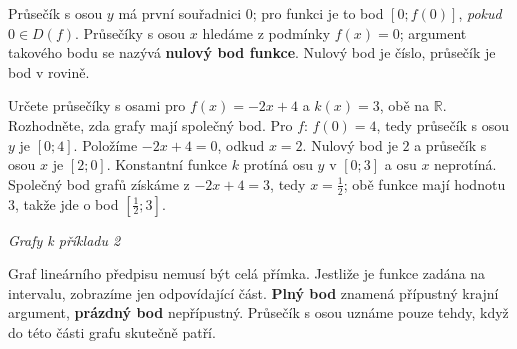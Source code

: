 \documentclass[11pt,a4paper]{article}
\begin{document}
Průsečík s osou $y$ má první souřadnici $0$; pro funkci je to bod $[0;f(0)]$,
\emph{pokud} $0\in D(f)$. Průsečíky s osou $x$ hledáme z podmínky $f(x)=0$;
argument takového bodu se nazývá \textbf{nulový bod funkce}. Nulový bod je číslo,
průsečík je bod v rovině.

\begin{prikladReseniBox}[title={Příklad 2}]
Určete průsečíky s osami pro $f(x)=-2x+4$ a $k(x)=3$,
obě na $\mathbb R$. Rozhodněte, zda grafy mají společný bod.
\tcblower
Pro $f$: $f(0)=4$, tedy průsečík s osou $y$ je $[0;4]$.
Položíme $-2x+4=0$, odkud $x=2$. Nulový bod je $2$ a průsečík s osou $x$ je $[2;0]$.
Konstantní funkce $k$ protíná osu $y$ v $[0;3]$ a osu $x$ neprotíná.
Společný bod grafů získáme z $-2x+4=3$, tedy $x=\tfrac12$;
obě funkce mají hodnotu $3$, takže jde o bod $[\tfrac12;3]$.
\end{prikladReseniBox}
\begin{center}
{\small\itshape Grafy k příkladu 2}\par\vspace{1mm}
\end{center}

Graf lineárního předpisu nemusí být celá přímka. Jestliže je funkce zadána na intervalu,
zobrazíme jen odpovídající část. \textbf{Plný bod} znamená přípustný krajní argument,
\textbf{prázdný bod} nepřípustný. Průsečík s osou uznáme pouze tehdy,
když do této části grafu skutečně patří.
\end{document}
